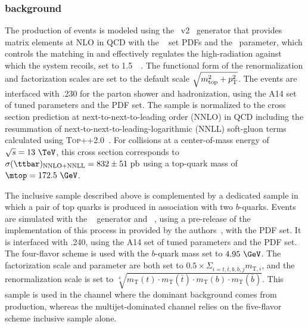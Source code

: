 \subsubsection{\ttbar background}
\label{sec:ttbarBackground}
The production of \ttbar events is modeled using the \powhegbox~v2~\cite{Frixione:2007nw,Nason:2004rx,Frixione:2007vw,Alioli:2010xd} generator that provides matrix elements at NLO in QCD with the \nnpdfnlo~\cite{Ball:2014uwa,Carrazza:2015aoa} set PDFs and the \hdamp\ parameter, which controls the matching in \powheg and effectively regulates the high-\pt radiation against which the \ttbar system recoils, set to 1.5~\mtop~\cite{ATL-PHYS-PUB-2016-020}.
The functional form of the renormalization and factorization scales are set to the default scale $\sqrt{m_{\textrm{top}}^2 + p_{\textrm T}^2}$.
The events are interfaced with \pythia.230 for the parton shower and hadronization, using the A14 set of tuned parameters and the \nnpdftwo PDF set.
The \ttbar sample is normalized to the cross section prediction at next-to-next-to-leading order (NNLO) in QCD including the resummation of next-to-next-to-leading-logarithmic (NNLL) soft-gluon terms calculated using \textsc{Top++2.0}~\cite{Beneke:2011mq,Cacciari:2011hy,Baernreuther:2012ws,Czakon:2012zr,Czakon:2012pz,Czakon:2013goa,Czakon:2011xx}.
For \pp collisions at a center-of-mass energy of $\sqrt{s}=13~\TeV$, this cross section corresponds to $\sigma(\ttbar)_{\textrm{NNLO+NNLL}} = \mathrm{832\pm51~pb}$ using a top-quark mass of $\mtop = 172.5~\GeV$.

The inclusive \ttbar sample described above is complemented by a dedicated sample in which a pair of top quarks is produced in association with two $b$-quarks. Events are simulated with the \powhegboxres~\cite{Jezo:2018yaf} generator and \openloops~\cite{Buccioni:2019sur,Cascioli:2011va,Denner:2016kdg}, using a pre-release of the implementation of this process in \powhegboxres provided by the authors~\cite{ttbbPowheg}, with the \nnpdfnlo PDF set. It is interfaced with \pythia.240, using the A14 set of tuned parameters and the \nnpdftwo PDF set. The four-flavor scheme is used with the $b$-quark mass set to $4.95~\GeV$. The factorization scale and \hdamp parameter are both set to $0.5\times\Sigma_{i=t,\bar{t},b,\bar{b},j}m_{\mathrm{T},i}$, and the renormalization scale is set to $\sqrt[4]{m_{\text{T}}(t)\cdot m_{\text{T}}(\bar{t})\cdot m_{\text{T}}(b)\cdot m_{\text{T}}(\bar{b})}$. This \ttbb sample is used in the \onelep channel where the dominant background comes from \ttbar production, whereas the multijet-dominated \allhad channel relies on the five-flavor scheme inclusive sample alone.

